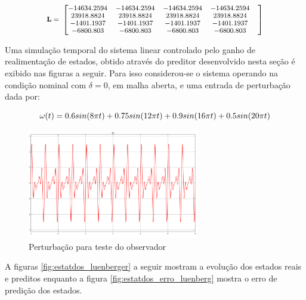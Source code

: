 \begin{equation} \label{eq:ganhos_pred} \small
    \begin{split}
        \mathbf{L}=\
    \end{split}
    \begin{bmatrix}
       -14634.2594& -14634.2594& -14634.2594& -14634.2594&\\
        23918.8824&  23918.8824&  23918.8824&  23918.8824&\\
        -1401.1937&  -1401.1937&  -1401.1937&  -1401.1937&\\
        -6800.803 &  -6800.803 &  -6800.803 &  -6800.803 &\\
    \end{bmatrix}
\end{equation}

Uma simulação temporal do sistema linear controlado pelo ganho de realimentação de estados, obtido através do preditor desenvolvido nesta seção é exibido nas figuras a seguir. Para isso considerou-se o sistema operando na condição nominal com $\delta=0$, em malha aberta, e uma entrada de perturbação dada por:

\begin{equation}\label{eq:estatdos_perturbacao} \footnotesize
    \omega(t)=0.6sin(8\pi t)+0.75sin(12\pi t)+0.9sin(16\pi t)+0.5sin(20\pi t)
\end{equation}

\FloatBarrier
\begin{figure}[htbp]
    \begin{centering}
    \includegraphics[width=7.5cm]{img/estatdos_perturbacao.png} 
    \caption{Perturbação para teste do observador}
    \label{fig:estatdos_perturbacao}
    \end{centering}
\end{figure}
\FloatBarrier

A figuras \ref{fig:estatdos_luenberger} a seguir mostram a evolução dos estados reais e preditos enquanto a figura \ref{fig:estatdos_erro_luenberg} mostra o erro de predição dos estados.

